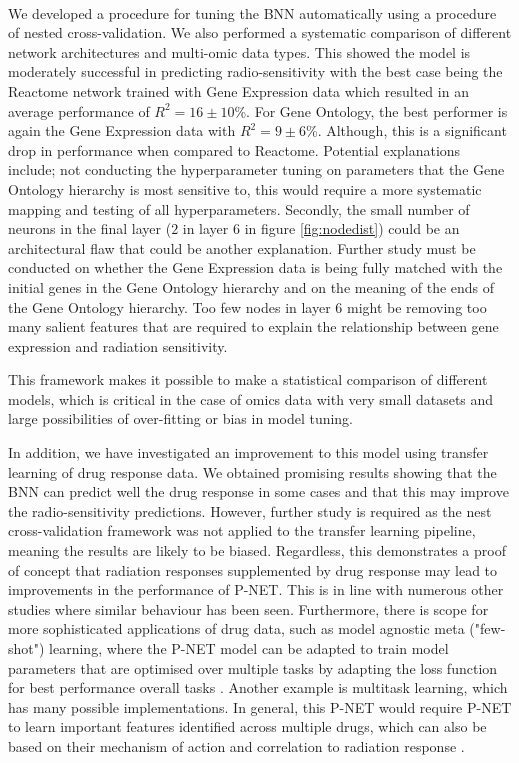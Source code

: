 \documentclass[NOTE, disdraft=true, UKenglish]{\DISCDTLATEXPATH UCLCDTDISdoc}
\begin{document}
\\ \indent 
We developed a procedure for tuning the BNN automatically using a procedure of nested cross-validation. We also performed a systematic comparison of different network architectures and multi-omic data types. This showed the model is moderately successful in predicting radio-sensitivity with the best case being the Reactome network trained with Gene Expression data which resulted in an average performance of $R^2=16\pm 10$\%. For Gene Ontology, the best performer is again the Gene Expression data with $R^2=9\pm 6$\%. Although, this is a significant drop in performance when compared to Reactome. Potential explanations include; not conducting the hyperparameter tuning on parameters that the Gene Ontology hierarchy is most sensitive to, this would require a more systematic mapping and testing of all hyperparameters. Secondly, the small number of neurons in the final layer ($2$ in layer $6$ in figure \ref{fig:nodedist}) could be an architectural flaw that could be another explanation. Further study must be conducted on whether the Gene Expression data is being fully matched with the initial genes in the Gene Ontology hierarchy and on the meaning of the ends of the Gene Ontology hierarchy. Too few nodes in layer 6 might be removing too many salient features that are required to explain the relationship between gene expression and radiation sensitivity.

This framework makes it possible to make a statistical comparison of different models, which is critical in the case of omics data with very small datasets and large possibilities of over-fitting or bias in model tuning. \\ \indent

In addition, we have investigated an improvement to this model using transfer learning of drug response data. We obtained promising results showing that the BNN can predict well the drug response in some cases and that this may improve the radio-sensitivity predictions. However, further study is required as the nest cross-validation framework was not applied to the transfer learning pipeline, meaning the results are likely to be biased. Regardless, this demonstrates a proof of concept that radiation responses supplemented by drug response may lead to improvements in the performance of P-NET. This is in line with numerous other studies where similar behaviour has been seen. Furthermore, there is scope for more sophisticated applications of drug data, such as model agnostic meta ("few-shot") learning, where the P-NET model can be adapted to train model parameters that are optimised over multiple tasks by adapting the loss function for best performance overall tasks \cite{MAML}. Another example is multitask learning, which has many possible implementations. In general, this P-NET would require P-NET to learn important features identified across multiple drugs, which can also be based on their mechanism of action and correlation to radiation response \cite{multitask}.
\end{document}
